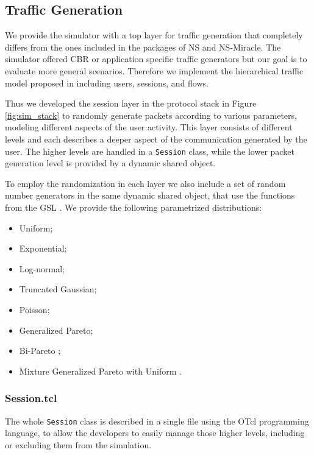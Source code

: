 \subsection{Traffic Generation} \label{sec:sim_traffic}

We provide the simulator with a top layer for traffic generation that completely differs from the ones included in the packages of \acs{NS} and \acs{NS-Miracle}. The simulator offered \ac{CBR} or application specific traffic generators but our goal is to evaluate more general scenarios. Therefore we implement the hierarchical traffic model proposed in \cite{Campus-WLAN} including users, sessions, and flows. %

Thus we developed the session layer in the protocol stack in Figure \ref{fig:sim_stack} to randomly generate packets according to various parameters, modeling different aspects of the user activity. This layer consists of different levels and each describes a deeper aspect of the communication generated by the user. The higher levels are handled in a \texttt{Session} class, while the lower packet generation level is provided by a dynamic shared object.

To employ the randomization in each layer we also include a set of random number generators in the same dynamic shared object, that use the functions from the \ac{GSL} \cite{GSL}. We provide the following parametrized distributions:
\begin{itemize}
	\item Uniform;
	\item Exponential;
	\item Log-normal;
	\item Truncated Gaussian;
	\item Poisson;
	\item Generalized Pareto;
	\item Bi-Pareto \cite{Nuzman2002};
	\item Mixture Generalized Pareto with Uniform \cite{DSA-Emp}.
\end{itemize}

\subsubsection{Session.tcl}

The whole \texttt{Session} class is described in a single file using the \acs{OTcl} programming language, to allow the developers to easily manage those higher levels, including or excluding them from the simulation.

